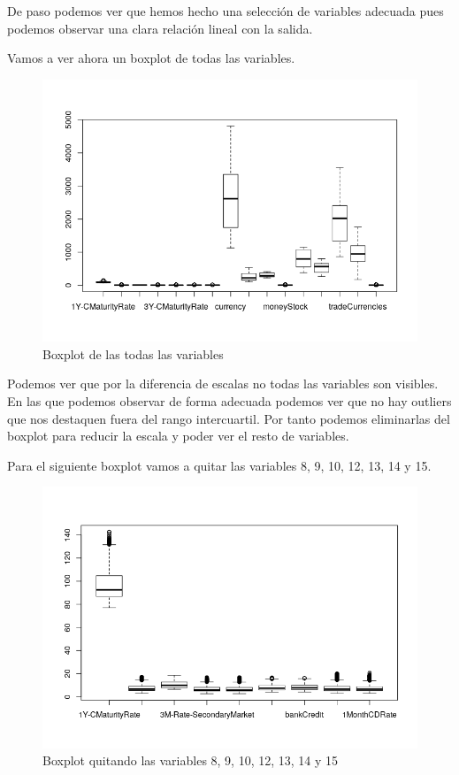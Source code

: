 \documentclass[12pt,a4paper]{article}
\begin{document}
De paso podemos ver que hemos hecho una selección de variables adecuada pues podemos observar una clara relación lineal con la salida.

Vamos a ver ahora un boxplot de todas las variables.

\begin{figure}[H]
	\centering
	\includegraphics[scale=0.8]{./Imagenes/boxplot_todas.png}
	\caption{Boxplot de las todas las variables}
\end{figure}

Podemos ver que por la diferencia de escalas no todas las variables son visibles. En las que podemos observar de forma adecuada podemos ver que no hay outliers que nos destaquen fuera del rango intercuartil. Por tanto podemos eliminarlas del boxplot para reducir la escala y poder ver el resto de variables.

Para el siguiente boxplot vamos a quitar las variables 8, 9, 10, 12, 13, 14 y 15.

\begin{figure}[H]
	\centering
	\includegraphics[scale=0.8]{./Imagenes/boxplot_filtrado1.png}
	\caption{Boxplot quitando las variables 8, 9, 10, 12, 13, 14 y 15}
\end{figure}
\end{document}
